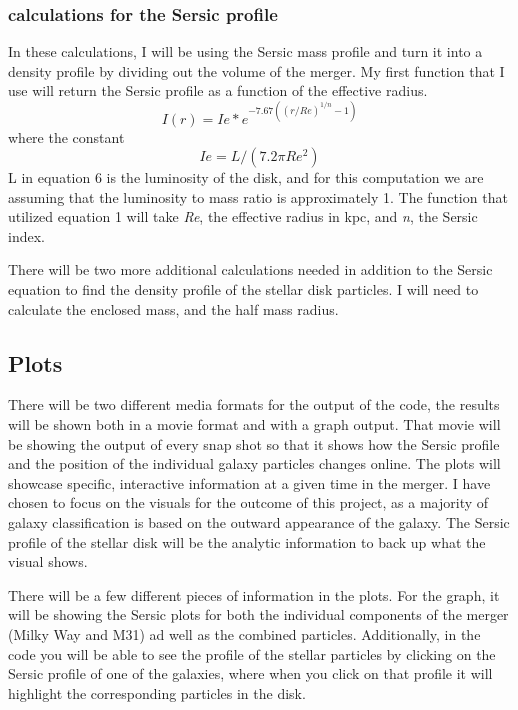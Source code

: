 \documentclass[twocolumn]{aastex63}
\begin{document}
\subsubsection{calculations for the Sersic profile}
In these calculations, I will be using the Sersic mass profile and turn it into a density profile by dividing out the volume of the merger. My first function that I use will return the Sersic profile as a function of the effective radius.
\begin{equation}
    I(r) = Ie*e^{-7.67((r/Re)^{1/n}-1)}
\end{equation}
where the constant
\begin{equation}
    Ie = L/(7.2\pi Re^2)
\end{equation}
L in equation 6 is the luminosity of the disk, and for this computation we are assuming that the luminosity to mass ratio is approximately 1. The function that utilized equation 1 will take \textit{Re}, the effective radius in kpc, and \textit{n}, the Sersic index. 

\medskip

There will be two more additional calculations needed in addition to the Sersic equation to find the density profile of the stellar disk particles. I will need to calculate the enclosed mass, and the half mass radius. 


\subsection{Plots}

There will be two different media formats for the output of the code, the results will be shown both in a movie format and with a graph output. That movie will be showing the output of every snap shot so that it shows how the Sersic profile and the position of the individual galaxy particles changes online. The plots will showcase specific, interactive information at a given time in the merger. I have chosen to focus on the visuals for the outcome of this project, as a majority of galaxy classification is based on the outward appearance of the galaxy. The Sersic profile of the stellar disk will be the analytic information to back up what the visual shows. 

\medskip

There will be a few different pieces of information in the plots. For the graph, it will be showing the Sersic plots for both the individual components of the merger (Milky Way and M31) ad well as the combined particles. Additionally, in the code you will be able to see the profile of the stellar particles by clicking on the Sersic profile of one of the galaxies, where when you click on that profile it will highlight the corresponding particles in the disk.
\end{document}
